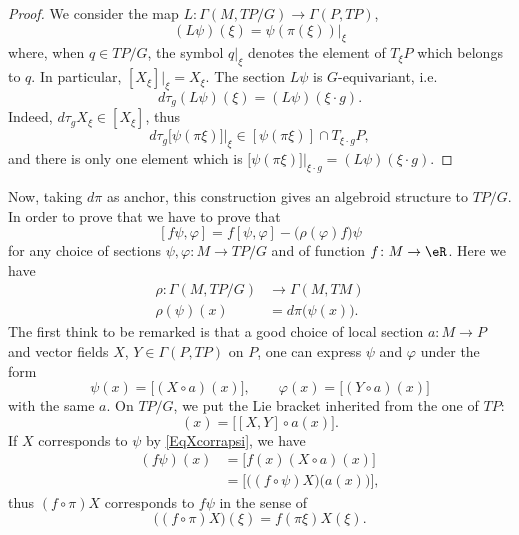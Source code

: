 \begin{proof}
	We consider the map $L\colon \Gamma(M,TP/G)\to \Gamma(P,TP)$,
	\[
		(L\psi)(\xi)=\psi(\pi(\xi))|_{\xi}
	\]
	where, when $q\in TP/G$, the symbol $q|_{\xi}$ denotes the element of $T_{\xi} P$ which belongs to $q$. In particular, $[X_{\xi}]|_{\xi}=X_{\xi}$. The section $L\psi$ is $G$-equivariant, i.e.
	\begin{equation}
		d\tau_{g}(L\psi)(\xi)=(L\psi)(\xi\cdot g).
	\end{equation}
	Indeed, $d\tau_{g}X_{\xi}\in [X_{\xi}]$, thus
	\[
		d\tau_{g}\big[ \psi(\pi\xi) \big]|_{\xi}\in [\psi(\pi\xi)]\cap T_{\xi\cdot g}P,
	\]
	and there is only one element which is $\big[ \psi(\pi\xi) \big]|_{\xi\cdot g}=(L\psi)(\xi\cdot g)$.
\end{proof}

Now, taking $d\pi$ as anchor, this construction gives an algebroid structure to $TP/G$. In order to prove that we have to prove that
\[
	[f\psi,\varphi]=f[\psi,\varphi]-\big( \rho(\varphi)f \big)\psi
\]
for any choice of sections $\psi,\varphi\colon M\to TP/G$ and of function $f\colon M\to \eR$. Here we have
\begin{equation}
	\begin{aligned}
		\rho\colon \Gamma(M,TP/G) & \to \Gamma(M,TM)          \\
		\rho(\psi)(x)             & =d\pi\big( \psi(x) \big).
	\end{aligned}
\end{equation}
The first think to be remarked is that a good choice of local section $a\colon M\to P$ and vector fields $X$, $Y\in\Gamma(P,TP)$ on $P$, one can express $\psi$ and $\varphi$ under the form
\begin{equation}  \label{EqXcorrapsi}
	\psi(x)=\big[ (X\circ a)(x) \big],\qquad \varphi(x)=\big[ (Y\circ a)(x) \big]
\end{equation}
with the same $a$. On $TP/G$, we put the Lie bracket inherited from the one of $TP$:
\begin{equation}
	[\psi,\varphi](x)=\Big[ [X,Y]\circ a(x) \Big].
\end{equation}
If $X$ corresponds to $\psi$ by \eqref{EqXcorrapsi}, we have
\begin{align*}
	(f\psi)(x) & =\Big[ f(x)(X\circ a)(x) \Big]                          \\
	           & =\Big[ \big( (f\circ\psi)X \big)\big( a(x) \big) \Big],
\end{align*}
thus $(f\circ \pi)X$ corresponds to $f\psi$ in the sense of
\[
	\Big( (f\circ \pi)X \Big)(\xi)=f(\pi\xi)X(\xi).
\]

